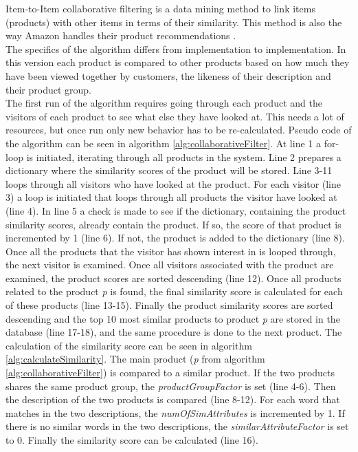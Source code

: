 Item-to-Item collaborative filtering is a data mining method to link items (products) with other items in terms of their similarity. This method is also the way \gls{Amazon} handles their product recommendations \cite{AmazonRecommendations}. \\
The specifics of the algorithm differs from implementation to implementation. In this version each product is compared to other products based on how much they have been viewed together by customers, the likeness of their description and their product group. \\
The first run of the algorithm requires going through each product and the visitors of each product to see what else they have looked at. This needs a lot of resources, but once run only new behavior has to be re-calculated. Pseudo code of the algorithm can be seen in algorithm \ref{alg:collaborativeFilter}. At line 1 a for-loop is initiated, iterating through all products in the system. Line 2 prepares a dictionary where the similarity scores of the product will be stored. Line 3-11 loops through all visitors who have looked at the product. For each visitor (line 3) a loop is initiated that loops through all products the visitor have looked at (line 4). In line 5 a check is made to see if the dictionary, containing the product similarity scores, already contain the product. If so, the score of that product is incremented by 1 (line 6). If not, the product is added to the dictionary (line 8). Once all the products that the visitor has shown interest in is looped through, the next visitor is examined. Once all visitors associated with the product are examined, the product scores are sorted descending (line 12). Once all products related to the product \textit{p} is found, the final similarity score is calculated for each of these products (line 13-15). Finally the product similarity scores are sorted descending and the top 10 most similar products to product \textit{p} are stored in the database (line 17-18), and the same procedure is done to the next product. The calculation of the similarity score can be seen in algorithm \ref{alg:calculateSimilarity}. The main product (\textit{p} from algorithm \ref{alg:collaborativeFilter}) is compared to a similar product. If the two products shares the same product group, the \textit{productGroupFactor} is set (line 4-6). Then the description of the two products is compared (line 8-12). For each word that matches in the two descriptions, the \textit{numOfSimAttributes} is incremented by 1. If there is no similar words in the two descriptions, the \textit{similarAttributeFactor} is set to 0. Finally the similarity score can be calculated (line 16).\\\\

